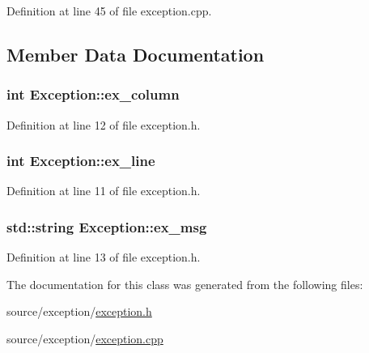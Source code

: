 Definition at line 45 of file exception.\-cpp.



\subsection{Member Data Documentation}
\hypertarget{class_exception_a5a08b0f7c24a639573c36ace567348c4}{
\subsubsection[{ex\-\_\-column}]{\setlength{\rightskip}{0pt plus 5cm}int Exception\-::ex\-\_\-column\hspace{0.3cm}{\ttfamily [protected]}}}\label{class_exception_a5a08b0f7c24a639573c36ace567348c4}


Definition at line 12 of file exception.\-h.

\hypertarget{class_exception_ab30bf54ebcf9ead45300ce422fb4b6b8}{
\subsubsection[{ex\-\_\-line}]{\setlength{\rightskip}{0pt plus 5cm}int Exception\-::ex\-\_\-line\hspace{0.3cm}{\ttfamily [protected]}}}\label{class_exception_ab30bf54ebcf9ead45300ce422fb4b6b8}


Definition at line 11 of file exception.\-h.

\hypertarget{class_exception_ac106ae3b8d10ae97ee0b71a270fbda27}{
\subsubsection[{ex\-\_\-msg}]{\setlength{\rightskip}{0pt plus 5cm}std\-::string Exception\-::ex\-\_\-msg\hspace{0.3cm}{\ttfamily [protected]}}}\label{class_exception_ac106ae3b8d10ae97ee0b71a270fbda27}


Definition at line 13 of file exception.\-h.



The documentation for this class was generated from the following files\-:\begin{DoxyCompactItemize}
\item 
source/exception/\hyperlink{exception_8h}{exception.\-h}\item 
source/exception/\hyperlink{exception_8cpp}{exception.\-cpp}\end{DoxyCompactItemize}

